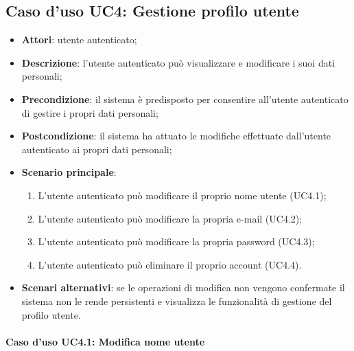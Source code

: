 \subsection{Caso d'uso UC4: Gestione profilo utente}

\begin{itemize}
	\item \textbf{Attori}: utente autenticato;
	\item \textbf{Descrizione}: l'utente autenticato può visualizzare e modificare i suoi dati personali;
	\item \textbf{Precondizione}: il sistema è predisposto per consentire all'utente autenticato di gestire i propri dati personali;
	\item \textbf{Postcondizione}: il sistema ha attuato le modifiche effettuate dall'utente autenticato ai propri dati personali;
	\item \textbf{Scenario principale}:
		\begin{enumerate}
			\item L'utente autenticato può modificare il proprio nome utente (UC4.1);
			\item L'utente autenticato può modificare la propria e-mail (UC4.2);
			\item L'utente autenticato può modificare la propria password (UC4.3);
			\item L'utente autenticato può eliminare il proprio account (UC4.4).
		\end{enumerate} 
	\item \textbf{Scenari alternativi}: se le operazioni di modifica non vengono confermate il sistema non le rende persistenti e visualizza le funzionalità di gestione del profilo utente. 
\end{itemize}

\paragraph{Caso d'uso UC4.1: Modifica nome utente}

